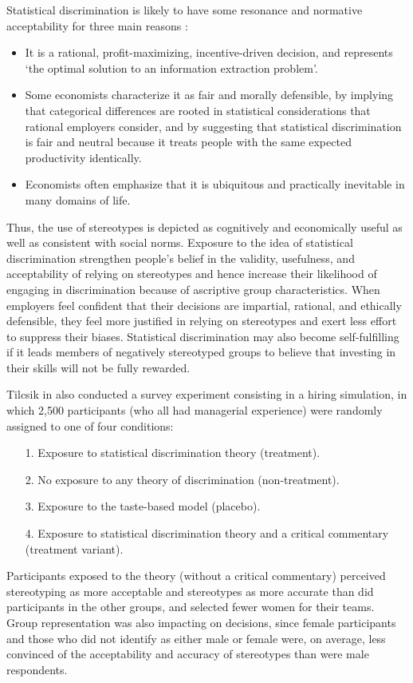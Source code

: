 Statistical discrimination is likely to have some resonance and normative acceptability for three main reasons \cite{tilcsik2021statistical}:
\begin{itemize}
\item It is a rational, profit-maximizing, incentive-driven decision, and represents `the optimal solution to an information extraction problem'.
\item Some economists characterize it as fair and morally defensible, by implying that categorical differences are rooted in statistical considerations that rational employers consider, and by suggesting that statistical discrimination is fair and neutral because it treats people with the same expected productivity identically.
\item Economists often emphasize that it is ubiquitous and practically inevitable in many domains of life.
\end{itemize}
Thus, the use of stereotypes is depicted as cognitively and economically useful as well as consistent with social norms. Exposure to the idea of statistical discrimination strengthen people's belief in the validity, usefulness, and acceptability of relying on stereotypes and hence increase their likelihood of engaging in discrimination because of ascriptive group characteristics. When employers feel confident that their decisions are impartial, rational, and ethically defensible, they feel more justified in relying on stereotypes and exert less effort to suppress their biases. Statistical discrimination may also become self-fulfilling if it leads members of negatively stereotyped groups to believe that investing in their skills will not be fully rewarded.

Tilcsik in \cite{tilcsik2021statistical} also conducted a survey experiment consisting in a hiring simulation, in which 2,500 participants (who all had managerial experience) were randomly assigned to one of four conditions:
\begin{itemize}
\item[1.] Exposure to statistical discrimination theory (treatment).
\item[2.] No exposure to any theory of discrimination (non-treatment).
\item[3.] Exposure to the taste-based model (placebo).
\item[4.] Exposure to statistical discrimination theory and a critical commentary (treatment variant).
\end{itemize}
Participants exposed to the theory (without a critical commentary) perceived stereotyping as more acceptable and stereotypes as more accurate than did participants in the other groups, and selected fewer women for their teams. Group representation was also impacting on decisions, since female participants and those who did not identify as either male or female were, on average, less convinced of the acceptability and accuracy of stereotypes than were male respondents.

